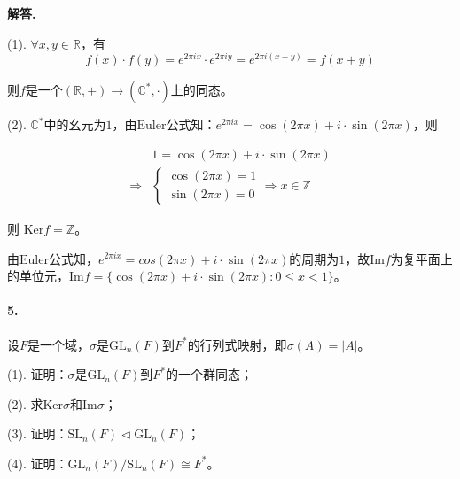 \documentclass[12pt, a4paper, oneside]{ctexart}
\newenvironment{solution}{\par\noindent\textbf{解答. }}{\bigskip\par}
\begin{document}
\begin{solution}

    (1). $\forall x, y\in \mathbb R$，有
    \begin{equation*}
        f(x)\cdot f(y)=e^{2\pi ix}\cdot e^{2\pi iy}=e^{2\pi i(x+y)}=f(x+y)
    \end{equation*}

    则$f$是一个$(\mathbb R, +)\rightarrow (\mathbb C^*, \cdot)$上的同态。

    (2). $\mathbb C^*$中的幺元为$1$，由$\text{Euler}$公式知：$e^{2\pi ix} = \cos(2\pi x) + i\cdot \sin(2\pi x)$，则

    \begin{equation*}
        \begin{aligned}
            &1 = \cos(2\pi x) + i\cdot \sin(2\pi x)\\
            \Rightarrow&\begin{cases}
                \cos(2\pi x) = 1\\
                \sin(2\pi x) = 0
            \end{cases}
            \Rightarrow x\in \mathbb Z
        \end{aligned}
    \end{equation*}

    则 $\text{Ker}f=\mathbb Z$。

    由$\text{Euler}$公式知，$e^{2\pi ix} = cos(2\pi x) + i\cdot \sin(2\pi x)$的周期为$1$，故$\text{Im} f$为复平面上的单位元，$\text{Im}f = \{\cos(2\pi x) + i\cdot\sin(2\pi x):0\leqslant x < 1\}$。
\end{solution}

\paragraph{5.}设$F$是一个域，$\sigma$是$\text{GL}_n(F)$到$F^*$的行列式映射，即$\sigma(A)=|A|$。

(1). 证明：$\sigma$是$\text{GL}_n(F)$到$F^*$的一个群同态；

(2). 求$\text{Ker}\sigma$和$\text{Im}\sigma$；

(3). 证明：$\text{SL}_n(F)\triangleleft \text{GL}_n(F)$；

(4). 证明：$\text{GL}_n(F)/\text{SL}_n(F)\cong F^*$。
\end{document}
